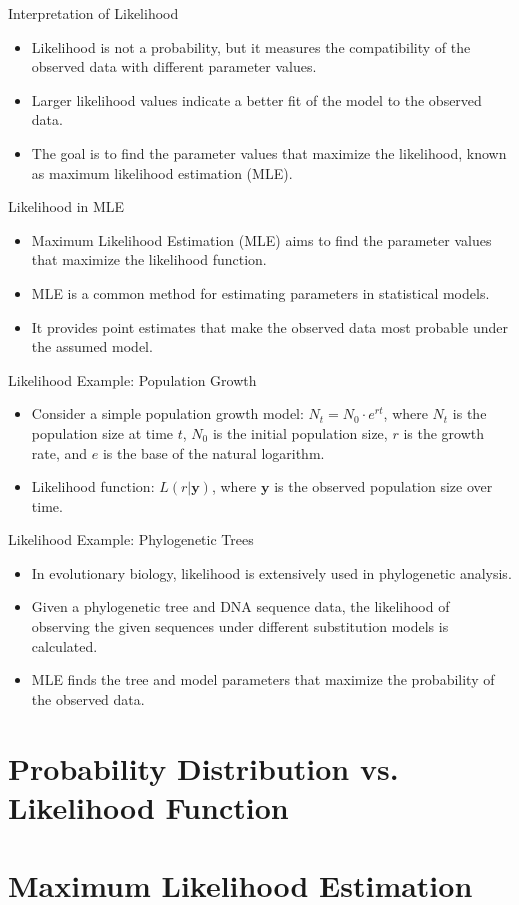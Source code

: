 \documentclass{beamer}
\begin{document}
\begin{frame}{Interpretation of Likelihood}
  \begin{itemize}
    \item Likelihood is not a probability, but it measures the compatibility of the observed data with different parameter values.
    \item Larger likelihood values indicate a better fit of the model to the observed data.
    \item The goal is to find the parameter values that maximize the likelihood, known as maximum likelihood estimation (MLE).
  \end{itemize}
\end{frame}

\begin{frame}{Likelihood in MLE}
  \begin{itemize}
    \item Maximum Likelihood Estimation (MLE) aims to find the parameter values that maximize the likelihood function.
    \item MLE is a common method for estimating parameters in statistical models.
    \item It provides point estimates that make the observed data most probable under the assumed model.
  \end{itemize}
\end{frame}

\begin{frame}{Likelihood Example: Population Growth}
  \begin{itemize}
    \item Consider a simple population growth model: \(N_t = N_0 \cdot e^{rt}\), where \(N_t\) is the population size at time \(t\), \(N_0\) is the initial population size, \(r\) is the growth rate, and \(e\) is the base of the natural logarithm.
    \item Likelihood function: \(L(r | \mathbf{y})\), where \(\mathbf{y}\) is the observed population size over time.
  \end{itemize}
\end{frame}

\begin{frame}{Likelihood Example: Phylogenetic Trees}
  \begin{itemize}
    \item In evolutionary biology, likelihood is extensively used in phylogenetic analysis.
    \item Given a phylogenetic tree and DNA sequence data, the likelihood of observing the given sequences under different substitution models is calculated.
    \item MLE finds the tree and model parameters that maximize the probability of the observed data.
  \end{itemize}
\end{frame}


\section{Probability Distribution vs. Likelihood Function}
 
 
 
 
 
\section{Maximum Likelihood Estimation}

 

 
\end{document}
